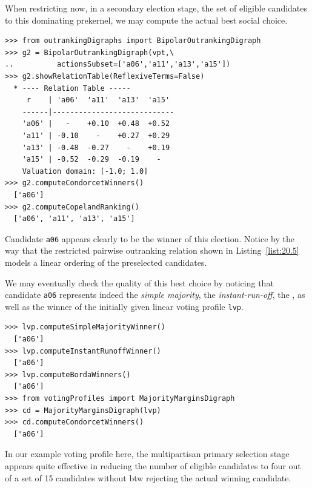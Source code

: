 
When restricting now, in a secondary election stage, the set of eligible candidates to this dominating prekernel, we may compute the actual best social choice.
\begin{lstlisting}[caption={Recommending the secondary election winner},label=list:20.5]
>>> from outrankingDigraphs import BipolarOutrankingDigraph
>>> g2 = BipolarOutrankingDigraph(vpt,\
..          actionsSubset=['a06','a11','a13','a15'])
>>> g2.showRelationTable(ReflexiveTerms=False)
  * ---- Relation Table -----
     r    | 'a06'  'a11'  'a13'  'a15'   
    ------|----------------------------
    'a06' |   -    +0.10  +0.48  +0.52  
    'a11' | -0.10    -    +0.27  +0.29  
    'a13' | -0.48  -0.27    -    +0.19  
    'a15' | -0.52  -0.29  -0.19    -   
    Valuation domain: [-1.0; 1.0]
>>> g2.computeCondorcetWinners()
  ['a06']
>>> g2.computeCopelandRanking()
  ['a06', 'a11', 'a13', 'a15']
\end{lstlisting}
Candidate \texttt{a06} appears clearly to be the winner of this election. Notice by the way that the restricted pairwise outranking relation shown in Listing~\ref{list:20.5} models a linear ordering of the preselected candidates.

We may eventually check the quality of this best choice by noticing that candidate \texttt{a06} represents indeed the \emph{simple majority}, the \emph{instant-run-off}, the \Borda, as well as the \Condorcet winner of the initially given linear voting profile \texttt{lvp}.
\begin{lstlisting}
>>> lvp.computeSimpleMajorityWinner()
  ['a06']
>>> lvp.computeInstantRunoffWinner()
  ['a06']
>>> lvp.computeBordaWinners()
  ['a06']
>>> from votingProfiles import MajorityMarginsDigraph
>>> cd = MajorityMarginsDigraph(lvp)
>>> cd.computeCondorcetWinners()
  ['a06']
\end{lstlisting}

In our example voting profile here, the multipartisan primary selection stage appears quite effective in reducing the number of eligible candidates to four out of a set of 15 candidates without btw rejecting the actual winning candidate.


